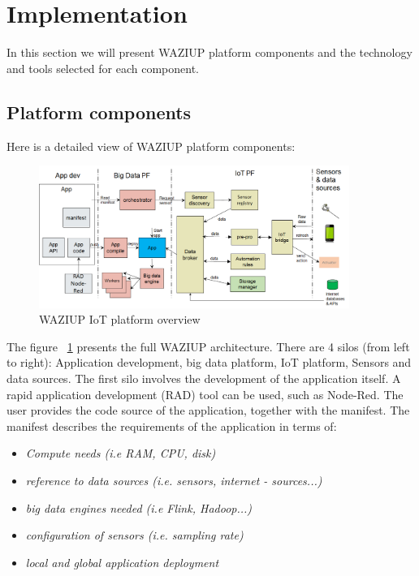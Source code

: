 
\section{Implementation}
\label{sec:implem}

In this section we will present WAZIUP platform components and the technology and tools selected for each component.

\subsection{Platform components}
Here is a detailed view of WAZIUP platform components:

\begin{figure}[h!]
\centering
\includegraphics[width=0.9\textwidth]{figs/platformOverview.png}
\caption{WAZIUP IoT platform overview}
\label{fig:platformOverview}
\end{figure}

The figure ~\ref{fig:platformOverview} presents the full WAZIUP architecture. 
There are 4 silos (from left to right): Application development, big data platform, IoT platform, Sensors and data sources. 
The first silo involves the development of the application itself. 
A rapid application development (RAD) tool can be used, such as Node-Red. 
The user provides the code source of the application, together with the manifest. 
The manifest describes the requirements of the application in terms of:
\begin{itemize}
	\item \emph{Compute needs (i.e RAM, CPU, disk)}
	\item \emph{reference to data sources (i.e. sensors, internet - sources...)}
	\item \emph{big data engines needed (i.e Flink, Hadoop...)}
	\item \emph{configuration of sensors (i.e. sampling rate)}
	\item \emph{local and global application deployment}
\end{itemize}

